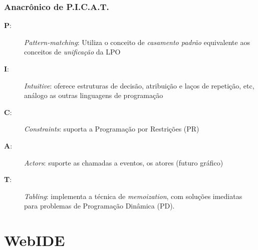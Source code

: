 \documentclass[brazil]{beamer}
\begin{document}
\begin{frame}
    \frametitle{Anacrônico de \textbf{P.I.C.A.T.}}
  
 \begin{description}
   
 
 \item [\textbf{P}:] \textit{Pattern-matching}:  Utiliza o conceito de \textit{casamento padrão}
 equivalente aos conceitos de \textit{unificação} da LPO
 
 \item [\textbf{I}:] \textit{Intuitive}: oferece estruturas de decisão, atribuição e 
 laços de repetição, etc, análogo as outras linguagens de programação
\item [\textbf{C}:] \textit{Constraints}: suporta a Programação por Restrições (PR)
 
     \item [\textbf{A}:] \textit{Actors}: suporte as chamadas a eventos, os atores (futuro gráfico) 
 
  \item [\textbf{T}:] \textit{Tabling}: implementa a técnica de \textit{memoization}, com soluções imediatas para problemas de Programação Dinâmica (PD).
   
  
\end{description}
\end{frame}


\section{WebIDE}
\end{document}
